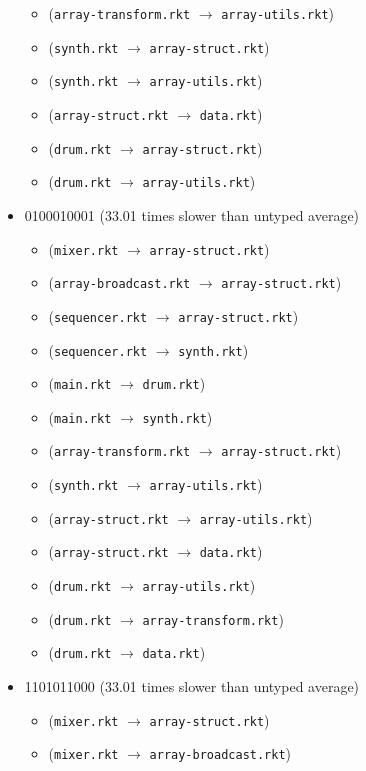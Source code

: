 \documentclass{article}
\newcommand{\mono}[1]{\texttt{#1}}
\begin{document}
\begin{itemize}
\begin{itemize}
  \item (\mono{array-transform.rkt} $\rightarrow$ \mono{array-utils.rkt})
  \item (\mono{synth.rkt} $\rightarrow$ \mono{array-struct.rkt})
  \item (\mono{synth.rkt} $\rightarrow$ \mono{array-utils.rkt})
  \item (\mono{array-struct.rkt} $\rightarrow$ \mono{data.rkt})
  \item (\mono{drum.rkt} $\rightarrow$ \mono{array-struct.rkt})
  \item (\mono{drum.rkt} $\rightarrow$ \mono{array-utils.rkt})
  \end{itemize}
\item 0100010001 (33.01 times slower than untyped average)
  \begin{itemize}
  \item (\mono{mixer.rkt} $\rightarrow$ \mono{array-struct.rkt})
  \item (\mono{array-broadcast.rkt} $\rightarrow$ \mono{array-struct.rkt})
  \item (\mono{sequencer.rkt} $\rightarrow$ \mono{array-struct.rkt})
  \item (\mono{sequencer.rkt} $\rightarrow$ \mono{synth.rkt})
  \item (\mono{main.rkt} $\rightarrow$ \mono{drum.rkt})
  \item (\mono{main.rkt} $\rightarrow$ \mono{synth.rkt})
  \item (\mono{array-transform.rkt} $\rightarrow$ \mono{array-struct.rkt})
  \item (\mono{synth.rkt} $\rightarrow$ \mono{array-utils.rkt})
  \item (\mono{array-struct.rkt} $\rightarrow$ \mono{array-utils.rkt})
  \item (\mono{array-struct.rkt} $\rightarrow$ \mono{data.rkt})
  \item (\mono{drum.rkt} $\rightarrow$ \mono{array-utils.rkt})
  \item (\mono{drum.rkt} $\rightarrow$ \mono{array-transform.rkt})
  \item (\mono{drum.rkt} $\rightarrow$ \mono{data.rkt})
  \end{itemize}
\item 1101011000 (33.01 times slower than untyped average)
  \begin{itemize}
  \item (\mono{mixer.rkt} $\rightarrow$ \mono{array-struct.rkt})
  \item (\mono{mixer.rkt} $\rightarrow$ \mono{array-broadcast.rkt})

\end{itemize}
\end{itemize}
\end{document}
